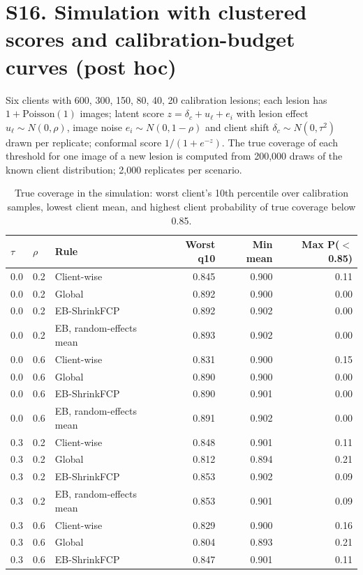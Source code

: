 \documentclass[10pt]{article}
\begin{document}
\section*{S16. Simulation with clustered scores and calibration-budget curves (post hoc)}
Six clients with 600, 300, 150, 80, 40, 20 calibration lesions; each lesion has $1+\mathrm{Poisson}(1)$ images; latent score $z=\delta_c+u_\ell+e_i$ with lesion effect $u_\ell\sim N(0,\rho)$, image noise $e_i\sim N(0,1-\rho)$ and client shift $\delta_c\sim N(0,\tau^2)$ drawn per replicate; conformal score $1/(1+e^{-z})$. The true coverage of each threshold for one image of a new lesion is computed from 200,000 draws of the known client distribution; 2,000 replicates per scenario.
\begin{table}[!htbp]
\centering
\scriptsize
\caption{True coverage in the simulation: worst client's 10th percentile over calibration samples, lowest client mean, and highest client probability of true coverage below 0.85.}
\label{tab:s16}
\begin{tabular}{@{}lllrrr@{}}
\toprule
$\tau$ & $\rho$ & Rule & Worst q10 & Min mean & Max P($<$0.85) \\
\midrule
0.0 & 0.2 & Client-wise & 0.845 & 0.900 & 0.11 \\
0.0 & 0.2 & Global & 0.892 & 0.900 & 0.00 \\
0.0 & 0.2 & EB-ShrinkFCP & 0.892 & 0.902 & 0.00 \\
0.0 & 0.2 & EB, random-effects mean & 0.893 & 0.902 & 0.00 \\
\midrule
0.0 & 0.6 & Client-wise & 0.831 & 0.900 & 0.15 \\
0.0 & 0.6 & Global & 0.890 & 0.900 & 0.00 \\
0.0 & 0.6 & EB-ShrinkFCP & 0.890 & 0.901 & 0.00 \\
0.0 & 0.6 & EB, random-effects mean & 0.891 & 0.902 & 0.00 \\
\midrule
0.3 & 0.2 & Client-wise & 0.848 & 0.901 & 0.11 \\
0.3 & 0.2 & Global & 0.812 & 0.894 & 0.21 \\
0.3 & 0.2 & EB-ShrinkFCP & 0.853 & 0.902 & 0.09 \\
0.3 & 0.2 & EB, random-effects mean & 0.853 & 0.901 & 0.09 \\
\midrule
0.3 & 0.6 & Client-wise & 0.829 & 0.900 & 0.16 \\
0.3 & 0.6 & Global & 0.804 & 0.893 & 0.21 \\
0.3 & 0.6 & EB-ShrinkFCP & 0.847 & 0.901 & 0.11 \\

\end{tabular}
\end{table}
\end{document}
